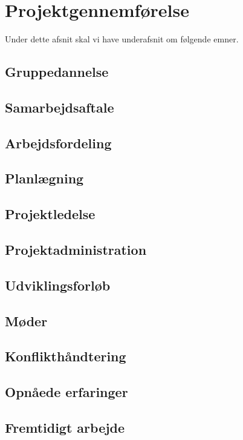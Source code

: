 \chapter{Projektgennemførelse}

Under dette afsnit skal vi have underafsnit om følgende emner.

\section{Gruppedannelse}

\section{Samarbejdsaftale}

\section{Arbejdsfordeling}

\section{Planlægning}

\section{Projektledelse}

\section{Projektadministration}

\section{Udviklingsforløb}

\section{Møder}

\section{Konflikthåndtering}

\section{Opnåede erfaringer}

\section{Fremtidigt arbejde}